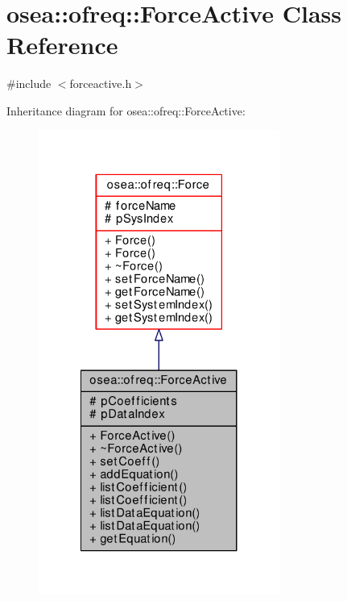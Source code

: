 \hypertarget{classosea_1_1ofreq_1_1_force_active}{\section{osea\-:\-:ofreq\-:\-:Force\-Active Class Reference}
\label{classosea_1_1ofreq_1_1_force_active}
}


{\ttfamily \#include $<$forceactive.\-h$>$}



Inheritance diagram for osea\-:\-:ofreq\-:\-:Force\-Active\-:
\nopagebreak
\begin{figure}[H]
\begin{center}
\leavevmode
\includegraphics[width=224pt]{classosea_1_1ofreq_1_1_force_active__inherit__graph}
\end{center}
\end{figure}
